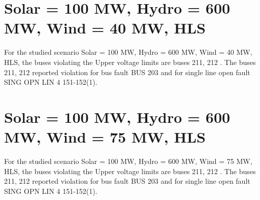 \documentclass[10pt]{report}
\begin{document}
\section{Solar = 100 MW, Hydro = 600 MW, Wind = 40 MW, HLS}

For the studied scenario Solar = 100 MW, Hydro = 600 MW, Wind = 40 MW, HLS, the buses violating the Upper voltage limits are buses 211, 212 .
The buses 211, 212 reported violation for bus fault BUS 203 and for single line open fault SING OPN LIN   4 151-152(1).
\begin{table}[H]
\caption{Contingencies reporting bus voltages greater than emergency voltage of 1.1 PU for scenario Solar = 100 MW, Hydro = 600 MW, Wind = 40 MW, HLS}
\label{HVSolar100MWHydro600MWWind40MWHLS}
\centering
{}
\end{table}

\section{Solar = 100 MW, Hydro = 600 MW, Wind = 75 MW, HLS}

For the studied scenario Solar = 100 MW, Hydro = 600 MW, Wind = 75 MW, HLS, the buses violating the Upper voltage limits are buses 211, 212 .
The buses 211, 212 reported violation for bus fault BUS 203 and for single line open fault SING OPN LIN   4 151-152(1).
\begin{table}[H]
\caption{Contingencies reporting bus voltages greater than emergency voltage of 1.1 PU for scenario Solar = 100 MW, Hydro = 600 MW, Wind = 75 MW, HLS}
\label{HVSolar100MWHydro600MWWind75MWHLS}
\centering
{}
\end{table}
\end{document}
